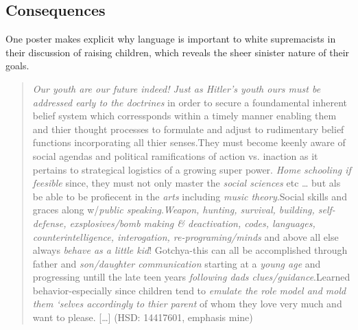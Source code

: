 \documentclass[output=paper,colorlinks,citecolor=brown]{langscibook}
\begin{document}
\subsection{Consequences}

One poster makes explicit why language is important to white supremacists in their discussion of raising children, which reveals the sheer sinister nature of their goals.

\begin{quote}
\emph{Our youth are our future indeed! Just as Hitler's youth ours must be addressed early to the doctrines} in order to secure a foundamental inherent belief system which corressponds within a timely manner enabling them and thier thought processes to formulate and adjust to rudimentary belief functions incorporating all thier senses.They must become keenly aware of social agendas and political ramifications of action vs. inaction as it pertains to strategical logistics of a growing super power. \emph{Home schooling if feesible} since, they must not only master the \emph{social sciences} etc \ldots{} but als be able to be profiecent in the \emph{arts} including \emph{music theory}.Social skills and graces along w/\emph{public speaking}.\emph{Weapon, hunting, survival, building, self-defense, exsplosives/bomb making \& deactivation, codes, languages, counterintelligence, interogation, re-programing/minds} and above all else always \emph{behave as a little kid}! Gotchya-this can all be accomplished through father and \emph{son/daughter communication} starting at a \emph{young age} and progressing untill the late teen years \emph{following dads clues/guidance}.Learned behavior-especially since children tend to \emph{emulate the role model and mold them `selves accordingly to thier parent} of whom they love very much and want to please. {[}\ldots{]} (HSD: 14417601, emphasis mine) 
\end{quote}
\end{document}
